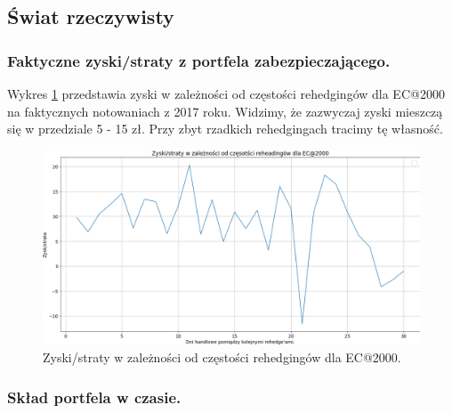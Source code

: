 \documentclass[12pt]{article}
\begin{document}
\subsection{Świat rzeczywisty}
\subsubsection{Faktyczne zyski/straty z portfela zabezpieczającego.}
Wykres \ref{fig:ec2000_zyski} przedstawia zyski w
 zależności od częstości rehedgingów dla EC@2000 na faktycznych notowaniach z 2017 roku. Widzimy, że zazwyczaj zyski mieszczą się w przedziale 5 - 15 zł. Przy zbyt rzadkich rehedgingach tracimy tę własność.
 \newline
\begin{figure}[htp]
    \centering
    \includegraphics[width=\textwidth,height=\textheight,keepaspectratio]{EC@2000_zyski_od_czestosci_reheadge.png}
    \caption{Zyski/straty w zależności od częstości rehedgingów dla EC@2000.}
    \label{fig:ec2000_zyski}
\end{figure}

\subsubsection{Skład portfela w czasie.}
\end{document}

